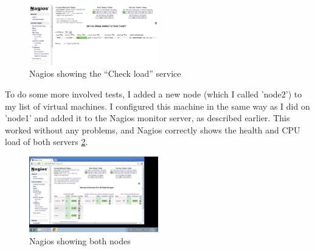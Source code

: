 \documentclass[12pt]{report}
\begin{document}
\begin{figure}[h!]
  \caption{Nagios showing the ``Check load'' service}
  \label{fig:nagios_nrpe_working_check_load}
  \centering
    \includegraphics[width=0.5\textwidth]{pics/nagios_2.png}
\end{figure}

To do some more involved tests, I added a new node (which I called
'node2') to my list of virtual machines. I configured this machine in
the same way as I did on 'node1' and added it to the Nagios monitor
server, as described earlier.
This worked without any problems, and Nagios correctly shows the health
and CPU load of both servers 
\cref{fig:nagios_nrpe_also_node2}.

\begin{figure}[h!]
  \caption{Nagios showing both nodes}
  \label{fig:nagios_nrpe_also_node2}
  \centering
    \includegraphics[width=0.5\textwidth]{pics/nagios_3.png}
\end{figure}
\end{document}
